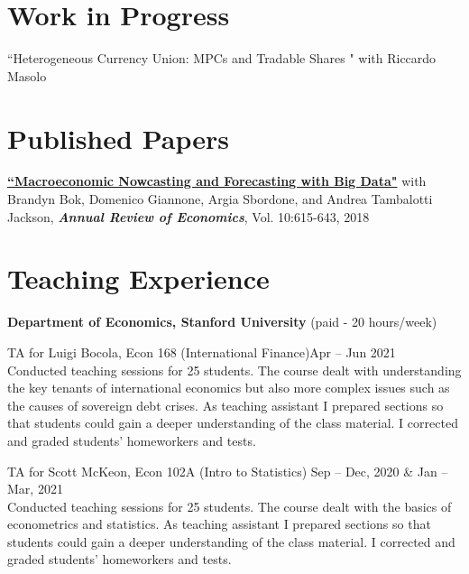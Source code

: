 \documentclass[margin,line]{res}                          %
\newenvironment{list1}{
	\begin{list}{\ding{113}}{%
			\setlength{\itemsep}{0in}
			\setlength{\parsep}{0in} \setlength{\parskip}{0in}
			\setlength{\topsep}{0in} \setlength{\partopsep}{0in}
			\setlength{\leftmargin}{0.17in}}}{\end{list}}
\begin{document}
\begin{resume}
	\section{\sc Work in Progress}
	\begin{list1}
		\item[] ``Heterogeneous Currency Union: MPCs and Tradable Shares " with Riccardo Masolo \smallskip
	\end{list1}
	
	\section{\sc Published Papers}
	\begin{list1}
		\item[] \href{https://www.annualreviews.org/doi/abs/10.1146/annurev-economics-083120-111540}{\textbf{``Macroeconomic Nowcasting and Forecasting with Big Data"}} with  Brandyn Bok, Domenico Giannone, Argia Sbordone, and Andrea Tambalotti  Jackson, \textit{\textbf{Annual Review of Economics}}, Vol. 10:615-643, 2018 \smallskip
	\end{list1}
	
	\section{\sc Teaching Experience}
	\begin{list1}
		\item[] \textbf{Department of Economics, Stanford University} (paid - 20 hours/week)\smallskip
		\item[] TA for Luigi Bocola, Econ 168 (International Finance)\hfill Apr -- Jun 2021\\
		Conducted teaching sessions for 25 students. The course dealt with understanding the key tenants of international economics but also more complex issues such as the causes of sovereign debt crises. As teaching assistant I prepared sections so that students could gain a deeper understanding of the class material. I corrected and graded students' homeworkers and tests.
		\smallskip
		\item[] TA for Scott McKeon, Econ 102A (Intro to Statistics) \hfill Sep -- Dec, 2020 \& Jan -- Mar, 2021\\
		Conducted teaching sessions for 25 students. The course dealt with the basics of econometrics and statistics. As teaching assistant I prepared sections so that students could gain a deeper understanding of the class material. I corrected and graded students' homeworkers and tests.\smallskip
	\end{list1}
	

\end{resume}
\end{document}
